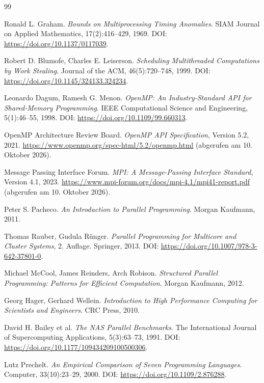 \documentclass[a4paper,12pt, twoside]{report}
\theoremstyle{definition}
\begin{document}
\begin{thebibliography}{99}

Ronald L. Graham.
\emph{Bounds on Multiprocessing Timing Anomalies}.
SIAM Journal on Applied Mathematics, 17(2):416--429, 1969.
DOI: \url{https://doi.org/10.1137/0117039}.

Robert D. Blumofe, Charles E. Leiserson.
\emph{Scheduling Multithreaded Computations by Work Stealing}.
Journal of the ACM, 46(5):720--748, 1999.
DOI: \url{https://doi.org/10.1145/324133.324234}.

Leonardo Dagum, Ramesh G. Menon.
\emph{OpenMP: An Industry-Standard API for Shared-Memory Programming}.
IEEE Computational Science and Engineering, 5(1):46--55, 1998.
DOI: \url{https://doi.org/10.1109/99.660313}.

OpenMP Architecture Review Board.
\emph{OpenMP API Specification}, Version 5.2, 2021.
\url{https://www.openmp.org/spec-html/5.2/openmp.html} (abgerufen am 10. Oktober 2026).

Message Passing Interface Forum.
\emph{MPI: A Message-Passing Interface Standard}, Version 4.1, 2023.
\url{https://www.mpi-forum.org/docs/mpi-4.1/mpi41-report.pdf} (abgerufen am 10. Oktober 2026).

Peter S. Pacheco.
\emph{An Introduction to Parallel Programming}.
Morgan Kaufmann, 2011.

Thomas Rauber, Gudula R\"unger.
\emph{Parallel Programming for Multicore and Cluster Systems}, 2. Auflage.
Springer, 2013.
DOI: \url{https://doi.org/10.1007/978-3-642-37801-0}.

Michael McCool, James Reinders, Arch Robison.
\emph{Structured Parallel Programming: Patterns for Efficient Computation}.
Morgan Kaufmann, 2012.

Georg Hager, Gerhard Wellein.
\emph{Introduction to High Performance Computing for Scientists and Engineers}.
CRC Press, 2010.

David H. Bailey et al.
\emph{The NAS Parallel Benchmarks}.
The International Journal of Supercomputing Applications, 5(3):63--73, 1991.
DOI: \url{https://doi.org/10.1177/109434209100500306}.


Lutz Prechelt.
\emph{An Empirical Comparison of Seven Programming Languages}.
Computer, 33(10):23--29, 2000.
DOI: \url{https://doi.org/10.1109/2.876288}.


\end{thebibliography}
\end{document}
